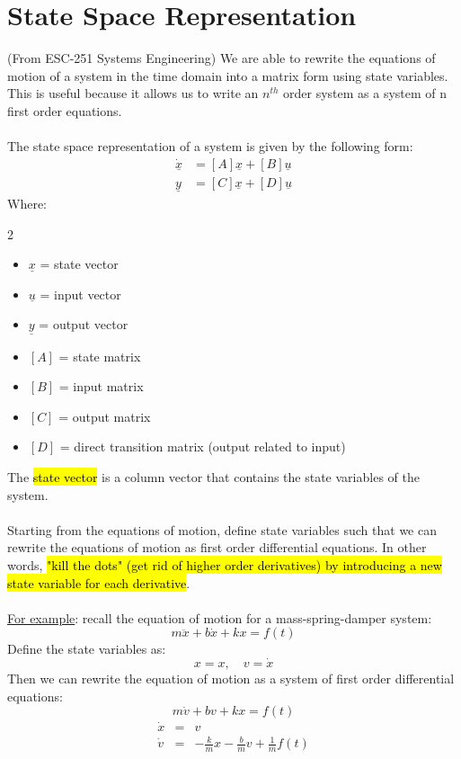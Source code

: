 ﻿\documentclass[12pt]{article}
\begin{document}
\section*{State Space Representation}
(From ESC-251 Systems Engineering) We are able to rewrite the equations of motion of a system in the time domain into a matrix form using state variables. This is useful because it allows us to write an $n^{th}$ order system as a system of n first order equations.\\\\
The state space representation of a system is given by the following form:
\[\begin{aligned}
\dot{\underline{x}} &= [A]{\underline{x}} + [B]\underline{u} \\
\underline{y} &= [C]{\underline{x}} + [D]\underline{u}
\end{aligned}\]
\newpage
Where:
\begin{multicols}{2}
\begin{itemize}
    \item $\underline{x}$ = state vector
    \item $\underline{u}$ = input vector
    \item $\underline{y}$ = output vector
    \newcolumn
    \item $[A]$ = state matrix
    \item $[B]$ = input matrix
    \item $[C]$ = output matrix
    \item $[D]$ = direct transition matrix (output related to input)
\end{itemize}
\end{multicols}
The \hl{state vector} is a column vector that contains the state variables of the system.\\\\
Starting from the equations of motion, define state variables such that we can rewrite the equations of motion as first order differential equations. In other words, \hl{"kill the dots" (get rid of higher order derivatives) by introducing a new state variable for each derivative}.\\\\
\underline{For example}: recall the equation of motion for a mass-spring-damper system:
\[m\ddot{x}+ b\dot{x} + kx = f(t)\]
Define the state variables as:
\[x = x,\quad v=\dot{x}\]
Then we can rewrite the equation of motion as a system of first order differential equations:
\[m\dot{v}+ bv + kx = f(t)\]
\begin{eqnarray*}
\dot{x} &=& v \\
\dot{v} &=& -\frac{k}{m}x - \frac{b}{m}v + \frac{1}{m}f(t)
\end{eqnarray*}
\end{document}
